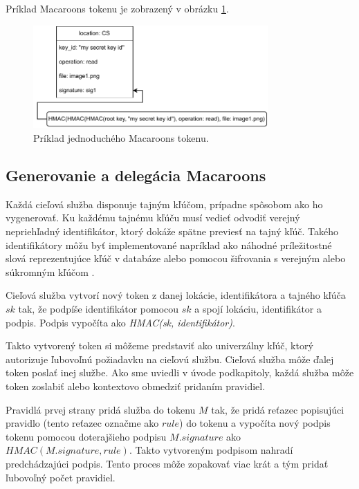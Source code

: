 Príklad Macaroons tokenu je zobrazený v obrázku \ref{fig:macaroon_example}.


\begin{figure}[H]
    \centerline{\includegraphics[width=0.8\textwidth]{images/basic_macaroon}}
    \caption[Macaroons token]{Príklad jednoduchého Macaroons tokenu.}
    \label{fig:macaroon_example}
\end{figure}

\subsection{Generovanie a delegácia Macaroons}

Každá cieľová služba disponuje tajným kľúčom, prípadne spôsobom ako ho vygenerovať. Ku každému tajnému kľúču musí vedieť odvodiť verejný nepriehľadný identifikátor, ktorý dokáže spätne previesť na tajný kľúč. Takého identifikátory môžu byť implementované napríklad ako náhodné príležitostné slová reprezentujúce kľúč v databáze alebo pomocou šifrovania s verejným alebo súkromným kľúčom \cite{macaroons_key_id}.

Cieľová služba vytvorí nový token z danej lokácie, identifikátora a tajného kľúča $sk$ tak, že podpíše identifikátor pomocou $sk$ a spojí lokáciu, identifikátor a podpis. Podpis vypočíta ako \textit{HMAC(sk, identifikátor)}.

Takto vytvorený token si môžeme predstaviť ako univerzálny kľúč, ktorý autorizuje ľubovoľnú požiadavku na cieľovú službu. Cieľová služba môže ďalej token poslať inej službe. Ako sme uviedli v úvode podkapitoly, každá služba môže token zoslabiť alebo kontextovo obmedziť pridaním pravidiel.

Pravidlá prvej strany pridá služba do tokenu $M$ tak, že pridá reťazec popisujúci pravidlo (tento reťazec označme ako $rule$) do tokenu a vypočíta nový podpis tokenu pomocou doterajšieho podpisu $M.signature$ ako $HMAC(M.signature, rule)$. Takto vytvoreným podpisom nahradí predchádzajúci podpis. Tento proces môže zopakovať viac krát a tým pridať ľubovoľný počet pravidiel.

